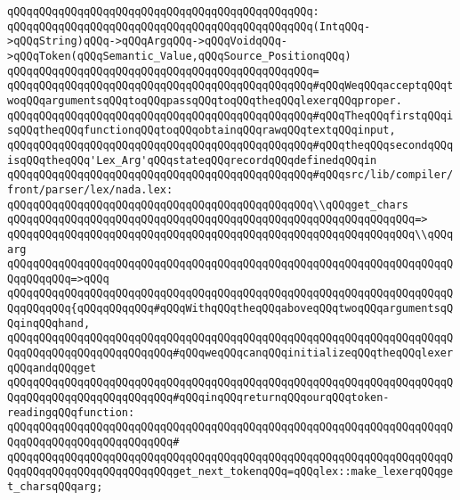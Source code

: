 \verb|qQQqqQQqqQQqqQQqqQQqqQQqqQQqqQQqqQQqqQQqqQQqqQQq:|\newline
\verb|qQQqqQQqqQQqqQQqqQQqqQQqqQQqqQQqqQQqqQQqqQQqqQQq(IntqQQq->qQQqString)qQQq->qQQqArgqQQq->qQQqVoidqQQq->qQQqToken(qQQqSemantic_Value,qQQqSource_PositionqQQq)|\newline
\verb|qQQqqQQqqQQqqQQqqQQqqQQqqQQqqQQqqQQqqQQqqQQqqQQq=|\newline
\verb|qQQqqQQqqQQqqQQqqQQqqQQqqQQqqQQqqQQqqQQqqQQqqQQq#qQQqWeqQQqacceptqQQqtwoqQQqargumentsqQQqtoqQQqpassqQQqtoqQQqtheqQQqlexerqQQqproper.|\newline
\verb|qQQqqQQqqQQqqQQqqQQqqQQqqQQqqQQqqQQqqQQqqQQqqQQq#qQQqTheqQQqfirstqQQqisqQQqtheqQQqfunctionqQQqtoqQQqobtainqQQqrawqQQqtextqQQqinput,|\newline
\verb|qQQqqQQqqQQqqQQqqQQqqQQqqQQqqQQqqQQqqQQqqQQqqQQq#qQQqtheqQQqsecondqQQqisqQQqtheqQQq'Lex_Arg'qQQqstateqQQqrecordqQQqdefinedqQQqin|\newline
\verb|qQQqqQQqqQQqqQQqqQQqqQQqqQQqqQQqqQQqqQQqqQQqqQQq#qQQqsrc/lib/compiler/front/parser/lex/nada.lex:|\newline
\newline
\verb|qQQqqQQqqQQqqQQqqQQqqQQqqQQqqQQqqQQqqQQqqQQqqQQq\\qQQqget_chars|\newline
\verb|qQQqqQQqqQQqqQQqqQQqqQQqqQQqqQQqqQQqqQQqqQQqqQQqqQQqqQQqqQQqqQQq=>|\newline
\verb|qQQqqQQqqQQqqQQqqQQqqQQqqQQqqQQqqQQqqQQqqQQqqQQqqQQqqQQqqQQqqQQq\\qQQqarg|\newline
\verb|qQQqqQQqqQQqqQQqqQQqqQQqqQQqqQQqqQQqqQQqqQQqqQQqqQQqqQQqqQQqqQQqqQQqqQQqqQQqqQQq=>qQQq|\newline
\verb|qQQqqQQqqQQqqQQqqQQqqQQqqQQqqQQqqQQqqQQqqQQqqQQqqQQqqQQqqQQqqQQqqQQqqQQqqQQqqQQq{qQQqqQQqqQQq#qQQqWithqQQqtheqQQqaboveqQQqtwoqQQqargumentsqQQqinqQQqhand,|\newline
\verb|qQQqqQQqqQQqqQQqqQQqqQQqqQQqqQQqqQQqqQQqqQQqqQQqqQQqqQQqqQQqqQQqqQQqqQQqqQQqqQQqqQQqqQQqqQQqqQQq#qQQqweqQQqcanqQQqinitializeqQQqtheqQQqlexerqQQqandqQQqget|\newline
\verb|qQQqqQQqqQQqqQQqqQQqqQQqqQQqqQQqqQQqqQQqqQQqqQQqqQQqqQQqqQQqqQQqqQQqqQQqqQQqqQQqqQQqqQQqqQQqqQQq#qQQqinqQQqreturnqQQqourqQQqtoken-readingqQQqfunction:|\newline
\verb|qQQqqQQqqQQqqQQqqQQqqQQqqQQqqQQqqQQqqQQqqQQqqQQqqQQqqQQqqQQqqQQqqQQqqQQqqQQqqQQqqQQqqQQqqQQqqQQq#|\newline
\verb|qQQqqQQqqQQqqQQqqQQqqQQqqQQqqQQqqQQqqQQqqQQqqQQqqQQqqQQqqQQqqQQqqQQqqQQqqQQqqQQqqQQqqQQqqQQqqQQqget_next_tokenqQQq=qQQqlex::make_lexerqQQqget_charsqQQqarg;|\newline
